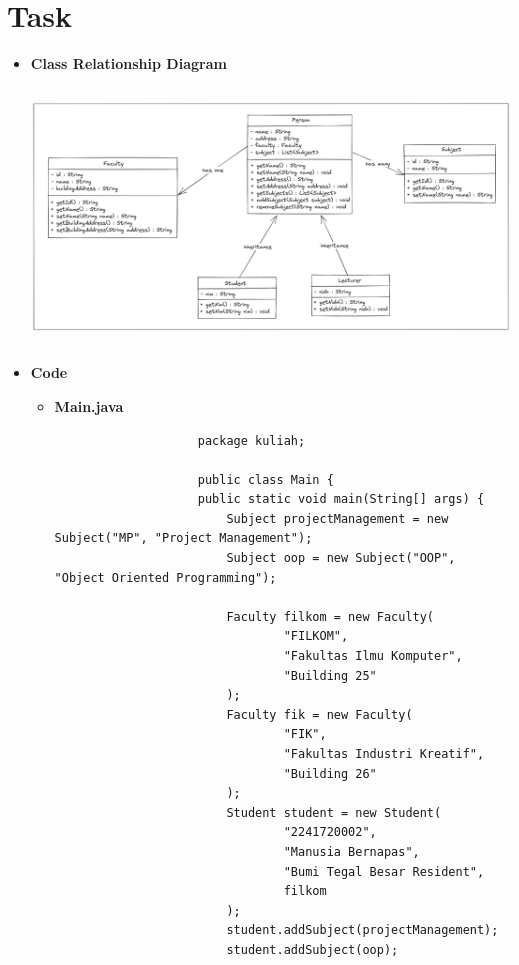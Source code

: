 \documentclass[12pt,titlepage]{article}
\begin{document}
\section{Task}
\begin{itemize}
    \item {
        \large{\textbf{Class Relationship Diagram}}
        \begin{center}
            \includegraphics[height=6.8cm]{./images/exodia.png}
        \end{center}
    }
    \item {
        \large{\textbf{Code}}
        \begin{itemize}
            \item {
                \textbf{Main.java}
                \begin{verbatim}
                    package kuliah;

                    public class Main {
                    public static void main(String[] args) {
                        Subject projectManagement = new Subject("MP", "Project Management");
                        Subject oop = new Subject("OOP", "Object Oriented Programming");

                        Faculty filkom = new Faculty(
                                "FILKOM",
                                "Fakultas Ilmu Komputer",
                                "Building 25"
                        );
                        Faculty fik = new Faculty(
                                "FIK",
                                "Fakultas Industri Kreatif",
                                "Building 26"
                        );
                        Student student = new Student(
                                "2241720002",
                                "Manusia Bernapas",
                                "Bumi Tegal Besar Resident",
                                filkom
                        );
                        student.addSubject(projectManagement);
                        student.addSubject(oop);


\end{verbatim}}
\end{itemize}}
\end{itemize}
\end{document}
